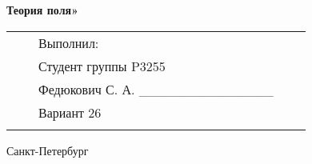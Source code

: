 \documentclass[12pt]{article}
\begin{document}
\begin{center}
		\textbf{Теория поля»}
		\par\bigskip\par\bigskip\par\bigskip\par\bigskip\par\bigskip\par\bigskip
		\par\bigskip\par\bigskip\par\bigskip\par\bigskip\par\bigskip\par\bigskip
		\par\bigskip\par\bigskip\par\bigskip\par\bigskip\par\bigskip\par\bigskip
		\normalsize
		\begin{tabular}{lllll}
							\hspace{170pt}	 							& \hspace{80pt}	&	Выполнил:								&\\
																		&			&	Студент группы P3255					&\\
																		& 			&	Федюкович С. А. \_\_\_\_\_\_\_\_\_\_\_\_\_\_	&\\
																		&			&	Вариант 26									&\\
																		&			&										&\\
		\end{tabular}
		\par\bigskip\par\bigskip\par\bigskip                                                  
		\par\bigskip \par\bigskip
		\par\bigskip\par\bigskip\par\bigskip\par\bigskip\par\bigskip\par\bigskip\par\bigskip\par\bigskip
		
		Санкт-Петербург
		\par{}
	\end{center}
	\newpage
	\pagestyle{plain}
	\setcounter{page}{1}
\end{document}
